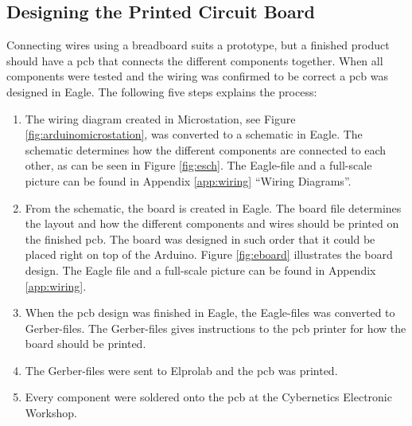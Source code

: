 \subsection{Designing the Printed Circuit Board}
Connecting wires using a breadboard suits a prototype, but a finished product should have a \acrshort{pcb} that connects the different components together. When all components were tested and the wiring was confirmed to be correct a \acrshort{pcb} was designed in Eagle. The following five steps explains the process:
\begin{enumerate}[1.]
\item The wiring diagram created in Microstation, see Figure \ref{fig:arduinomicrostation}, was converted to a schematic in Eagle. The schematic determines how the different components are connected to each other, as can be seen in Figure \ref{fig:esch}. The Eagle-file and a full-scale picture can be found in Appendix \ref{app:wiring} ``Wiring Diagrams''.
\item From the schematic, the board is created in Eagle. The board file determines the layout and how the different components and wires should be printed on the finished \acrshort{pcb}. The board was designed in such order that it could be placed right on top of the Arduino. Figure \ref{fig:eboard} illustrates the board design. The Eagle file and a full-scale picture can be found in Appendix \ref{app:wiring}.
\item When the \acrshort{pcb} design was finished in Eagle, the Eagle-files was converted to Gerber-files. The Gerber-files gives instructions to the \acrshort{pcb} printer for how the board should be printed.
\item The Gerber-files were sent to Elprolab and the \acrshort{pcb} was printed.
\item Every component were soldered onto the \acrshort{pcb} at the Cybernetics Electronic Workshop.
\end{enumerate}